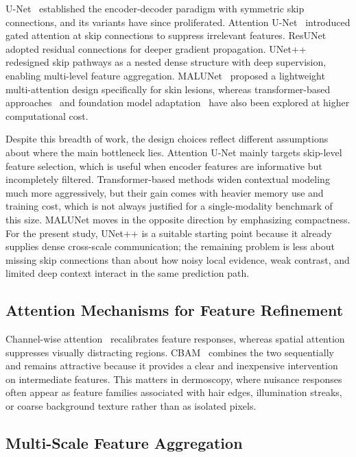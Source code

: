 \documentclass[conference]{IEEEtran}
\begin{document}
U-Net~\cite{ronneberger2015} established the encoder-decoder paradigm with symmetric skip connections, and its variants have since proliferated. Attention U-Net~\cite{oktay2018} introduced gated attention at skip connections to suppress irrelevant features. ResUNet~\cite{zhang2018} adopted residual connections for deeper gradient propagation. UNet++~\cite{zhou2018} redesigned skip pathways as a nested dense structure with deep supervision, enabling multi-level feature aggregation. MALUNet~\cite{ruan2022} proposed a lightweight multi-attention design specifically for skin lesions, whereas transformer-based approaches~\cite{chen2021transunet} and foundation model adaptation~\cite{ma2024medsam} have also been explored at higher computational cost.

Despite this breadth of work, the design choices reflect different assumptions about where the main bottleneck lies. Attention U-Net mainly targets skip-level feature selection, which is useful when encoder features are informative but incompletely filtered. Transformer-based methods widen contextual modeling much more aggressively, but their gain comes with heavier memory use and training cost, which is not always justified for a single-modality benchmark of this size. MALUNet moves in the opposite direction by emphasizing compactness. For the present study, UNet++ is a suitable starting point because it already supplies dense cross-scale communication; the remaining problem is less about missing skip connections than about how noisy local evidence, weak contrast, and limited deep context interact in the same prediction path.

\subsection{Attention Mechanisms for Feature Refinement}

Channel-wise attention~\cite{hu2018} recalibrates feature responses, whereas spatial attention suppresses visually distracting regions. CBAM~\cite{woo2018} combines the two sequentially and remains attractive because it provides a clear and inexpensive intervention on intermediate features. This matters in dermoscopy, where nuisance responses often appear as feature families associated with hair edges, illumination streaks, or coarse background texture rather than as isolated pixels.

\subsection{Multi-Scale Feature Aggregation}
\end{document}
